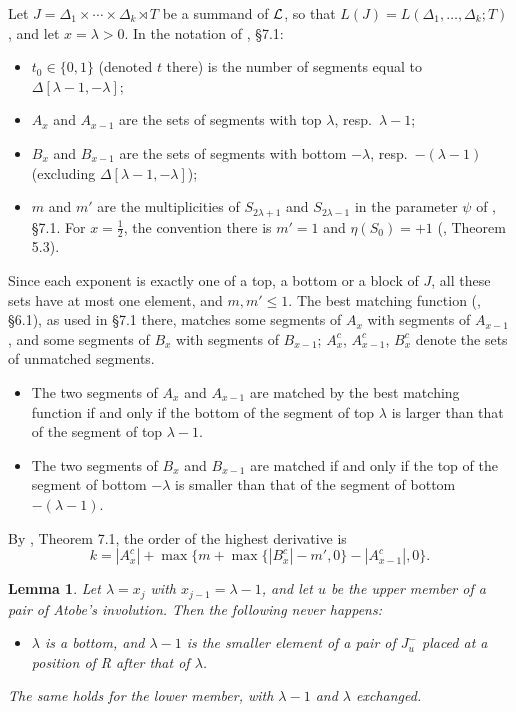 \documentclass[a4paper,12pt,leqno]{amsart}
\theoremstyle{plain}
\newtheorem{lemma}[thm]{Lemma}
\theoremstyle{definition}
\begin{document}
Let $J=\Delta_1\times\cdots\times\Delta_k\rtimes T$ be a summand of $\mathcal{L}$, so that
$L(J)=L(\Delta_1,\ldots,\Delta_k;T)$, and let $x=\lambda>0$. In the notation of \cite{AM23}, \S7.1:
\begin{itemize}
\item $t_0\in\{0,1\}$ (denoted $t$ there) is the number of segments equal to $\Delta[\lambda-1,-\lambda]$;
\item $A_x$ and $A_{x-1}$ are the sets of segments with top $\lambda$, resp.\ $\lambda-1$;
\item $B_x$ and $B_{x-1}$ are the sets of segments with bottom $-\lambda$, resp.\ $-(\lambda-1)$
(excluding $\Delta[\lambda-1,-\lambda]$);
\item $m$ and $m'$ are the multiplicities of $S_{2\lambda+1}$ and $S_{2\lambda-1}$ in the parameter
$\psi$ of \cite{AM23}, \S7.1. For $x=\tfrac12$, the convention there is $m'=1$ and
$\eta(S_0)=+1$ (\cite{AM23}, Theorem 5.3).
\end{itemize}
Since each exponent is exactly one of a top, a bottom or a block of $J$, all these sets have at most one element,
and $m,m'\leq1$.
The best matching function (\cite{AM23}, \S6.1), as used in \S7.1 there, matches some segments of $A_x$ with segments of
$A_{x-1}$, and some segments of $B_x$ with segments of $B_{x-1}$; $A^c_x$, $A^c_{x-1}$, $B^c_x$ denote the
sets of unmatched segments.
\begin{itemize}
\item The two segments of $A_x$ and $A_{x-1}$ are matched by the best matching function if and only
if the bottom of the segment of top $\lambda$ is larger than that of the segment of top
$\lambda-1$.
\item The two segments of $B_x$ and $B_{x-1}$ are matched if and only if the top of the segment of
bottom $-\lambda$ is smaller than that of the segment of bottom $-(\lambda-1)$.
\end{itemize}
By \cite{AM23}, Theorem 7.1, the order of the highest derivative is
\[k=|A^c_x|+\max\big\{m+\max\{|B^c_x|-m',0\}-|A^c_{x-1}|,0\big\}.\]


\begin{lemma}\label{lem:vacuous} Let $\lambda=x_j$ with $x_{j-1}=\lambda-1$, and let $u$ be the upper
member of a pair of Atobe's involution. Then the following never happens:
\begin{itemize}
\item[$(\ast)$] $\lambda$ is a bottom, and $\lambda-1$ is the smaller
element of a pair of $J^-_u$ placed at a position of R after that of $\lambda$.
\end{itemize}
The same holds for the lower member, with $\lambda-1$ and $\lambda$ exchanged.
\end{lemma}
\end{document}
